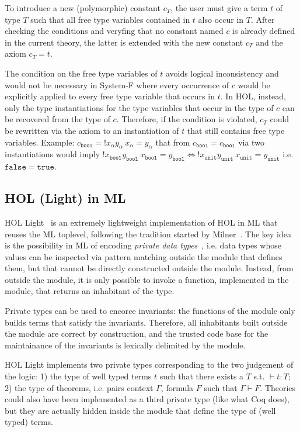 \documentclass[preprint]{sigplanconf}
\begin{document}
To introduce a new (polymorphic) constant $c_T$, the user must give a term $t$
of type $T$ such that all free type variables contained in $t$ also occur in
$T$. After checking the conditions and veryfing that no constant named $c$ is already defined in the current theory, the latter is extended with the new
constant $c_T$ and the axiom $c_T = t$.

The condition on the free type variables of $t$ avoids logical inconsistency
and would not be necessary in System-F where every occurrence of $c$ would be explicitly applied to every free type variable that occurs in $t$. In HOL, instead, only the type instantiations for the type variables that occur in the type of $c$ can be recovered from the type of $c$. Therefore, if the condition is violated, $c_T$ could be rewritten via the axiom to an instantiation of $t$ that still contains free type variables. Example: $c_\mathtt{bool} = ! x_\alpha y_\alpha \  x_\alpha = y_\alpha$ that from $c_\mathtt{bool} = c_\mathtt{bool}$ via two instantiations would imply $! x_\mathtt{bool} y_\mathtt{bool} \  x_\mathtt{bool}= y_\mathtt{bool} \iff ! x_\mathtt{unit} y_\mathtt{unit} \  x_\mathtt{unit}= y_\mathtt{unit}$ i.e. $\mathtt{false} = \mathtt{true}$.

\subsection{HOL (Light) in ML}
HOL Light~\cite{??} is an extremely lightweight implementation of HOL in ML that reuses the ML toplevel, following the tradition started by Milner~\cite{???}. The key idea is the possibility in ML of encoding \emph{private data types}~\cite{??}, i.e. data types whose values can be inspected via pattern matching outside the module that defines them, but that cannot be directly constructed outside the module. Instead, from outside the module, it is only possible to invoke a function, implemented in the module, that returns an inhabitant of the type.

Private types can be used to encorce invariants: the functions of the module only builds terms that satisfy the invariants. Therefore, all inhabitants built outside the module are correct by construction, and the trusted code base for the maintainance of the invariants is lexically delimited by the module.

HOL Light implements two private types corresponding to the two judgement of the logic: 1) the type of well typed terms $t$ such that there exists a $T$ s.t. $\vdash t : T$; 2) the type of theorems, i.e. pairs context $\Gamma$, formula $F$ such that $\Gamma \vdash F$. Theories could also have been implemented as a third private type (like what Coq does), but they are actually hidden inside the module that define the type of (well typed) terms.
\end{document}
